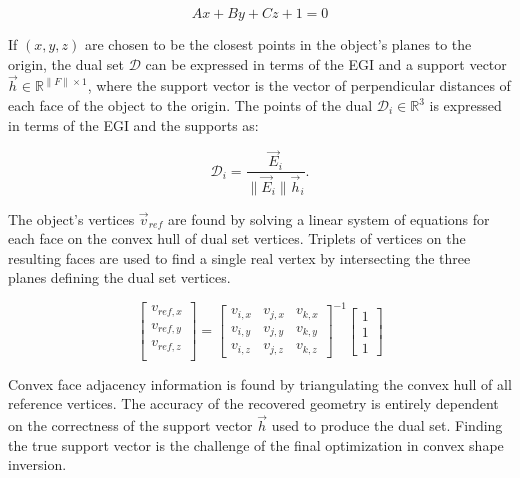 \begin{equation} \label{eq:dual_abc_form}
  Ax + By + Cz + 1 = 0
\end{equation}

If $(x, y, z)$ are chosen to be the closest points in the object's planes to the origin, the dual set $\mathcal{D}$ can be expressed in terms of the EGI and a support vector $\vec{h} \in \mathbb{R}^{\|F\| \times 1}$, where the support vector is the vector of perpendicular distances of each face of the object to the origin. The points of the dual $\mathcal{D}_i \in \mathbb{R}^3$ is expressed in terms of the EGI and the supports as:

\begin{equation} \label{eq:dual_egi_form}
  \mathcal{D}_i = \frac{\vec{E}_i}{ \| \vec{E}_i \| \vec{h}_i}.
\end{equation}

The object's vertices $\vec{v}_{ref}$ are found by solving a linear system of equations for each face on the convex hull of dual set vertices. Triplets of vertices on the resulting faces are used to find a single real vertex by intersecting the three planes defining the dual set vertices.

\begin{equation} \label{eq:vertex_recovery}
  \begin{bmatrix}
    v_{ref,x} \\
    v_{ref,y} \\
    v_{ref,z} \\
  \end{bmatrix} = \begin{bmatrix}
    v_{i,x} & v_{j,x} & v_{k,x} \\
    v_{i,y} & v_{j,y} & v_{k,y} \\
    v_{i,z} & v_{j,z} & v_{k,z}
  \end{bmatrix}^{-1} \begin{bmatrix}
    1 \\ 1 \\ 1
  \end{bmatrix}
\end{equation}

Convex face adjacency information is found by triangulating the convex hull of all reference vertices. The accuracy of the recovered geometry is entirely dependent on the correctness of the support vector $\vec{h}$ used to produce the dual set. Finding the true support vector is the challenge of the final optimization in convex shape inversion.


